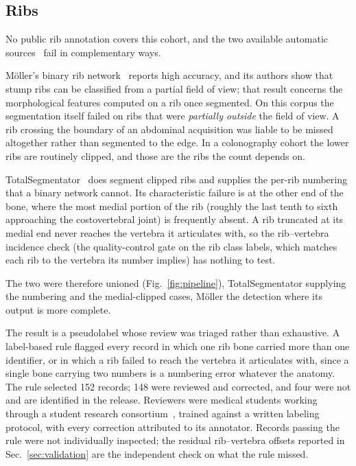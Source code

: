 \documentclass[aapm,mph,amsmath,amssymb,reprint]{revtex4-2}
\newif\ifreview \reviewtrue
\newcommand{\consortium}{\ifreview a student research consortium\else OpenSpineConsortium\fi}
\begin{document}
\subsection{Ribs}

No public rib annotation covers this cohort, and the two available automatic
sources~\cite{moller2026,totalsegmentator} fail in complementary ways.

Möller's binary rib network~\cite{moller2026} reports high accuracy, and its authors show
that stump ribs can be classified from a partial field of view; that result concerns the
morphological features computed on a rib once segmented. On this corpus the segmentation
itself failed on ribs that were \emph{partially outside} the field of view. A rib crossing
the boundary of an abdominal acquisition was liable to be missed altogether rather than
segmented to the edge.  In a colonography cohort the lower ribs are routinely clipped, and
those are the ribs the count depends on.

TotalSegmentator~\cite{totalsegmentator} does segment clipped ribs and supplies the
per-rib numbering that a binary network cannot. Its characteristic failure is at the other end of the bone, where the most medial portion of the rib (roughly the last tenth to sixth
approaching the costovertebral joint) is frequently absent. A rib truncated at its
medial end never reaches the vertebra it articulates with, so the rib--vertebra incidence
check (the quality-control gate on the rib class labels, which matches each rib to the
vertebra its number implies) has nothing to test.

The two were therefore unioned (Fig.~\ref{fig:pipeline}), TotalSegmentator supplying the
numbering and the medial-clipped cases, Möller the detection where its output is more
complete.

The result is a pseudolabel whose review was triaged rather than exhaustive. A label-based
rule flagged every record in which one rib
bone carried more than one identifier, or in which a rib failed to reach the vertebra it
articulates with, since a single bone carrying two numbers is a numbering error whatever the anatomy. The
rule selected 152 records; 148 were reviewed and corrected, and four
were not and are identified in the release. Reviewers were medical students working through \consortium~\cite{osc2026}, trained against
a written labeling protocol, with every correction attributed to its annotator. Records passing the rule were not individually inspected;
the residual rib--vertebra offsets reported in Sec.~\ref{sec:validation} are the
independent check on what the rule missed.
\end{document}
